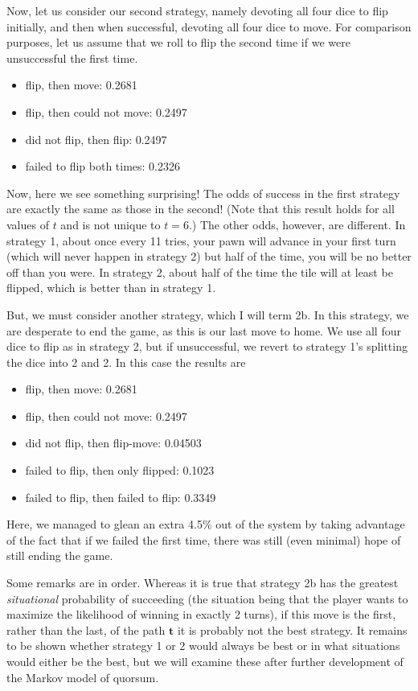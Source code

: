 \documentclass[letterpaper,11pt]{article}
\begin{document}
Now, let us consider our second strategy, namely devoting all four dice to
flip initially, and then when successful, devoting all four dice to move.  For
comparison purposes, let us assume that we roll to flip the second time if we
were unsuccessful the first time.
\begin{itemize}
\item flip, then move: 0.2681
\item flip, then could not move: 0.2497
\item did not flip, then flip: 0.2497
\item failed to flip both times: 0.2326
\end{itemize}
Now, here we see something surprising!  The odds of success in the first
strategy are exactly the same as those in the second!  (Note that this result
holds for all values of $t$ and is not unique to $t=6$.)  The other odds,
however, are different.  In strategy 1, about once every 11 tries, your pawn
will advance in your first turn (which will never happen in strategy 2) but
half of the time, you will be no better off than you were.  In strategy 2,
about half of the time the tile will at least be flipped, which is better than
in strategy 1.

But, we must consider another strategy, which I will term 2b.  In this strategy,
we are desperate to end the game, as this is our last move to home.  We use
all four dice to flip as in strategy 2, but if unsuccessful, we revert to
strategy 1's splitting the dice into 2 and 2.  In this case the results are
\begin{itemize}
\item flip, then move: 0.2681
\item flip, then could not move: 0.2497
\item did not flip, then flip-move: 0.04503
\item failed to flip, then only flipped: 0.1023
\item failed to flip, then failed to flip: 0.3349
\end{itemize}
Here, we managed to glean an extra 4.5\% out of the system by taking advantage
of the fact that if we failed the first time, there was still (even minimal)
hope of still ending the game.

Some remarks are in order.  Whereas it is true that strategy 2b has the greatest
\textit{situational} probability of succeeding (the situation being that the 
player wants to maximize the likelihood of winning in exactly 2 turns), if this
move is the first, rather than the last, of the path $\mathbf{t}$ it is probably
not the best strategy.  It remains to be shown whether strategy 1 or 2 would 
always be best or in what situations would either be the best, but we will
examine these after further development of the Markov model of quorsum.
\end{document}
